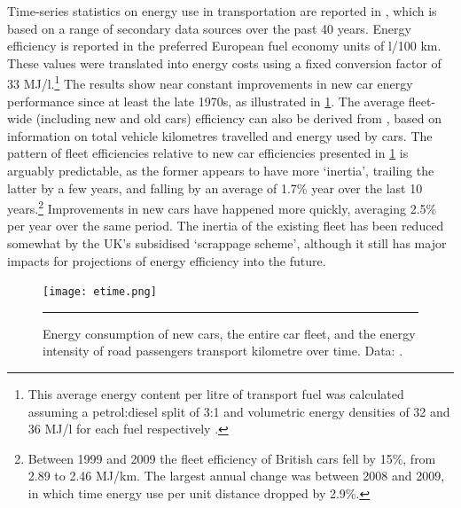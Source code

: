 Time-series statistics on energy use in transportation are
reported in \citet{Decc2011t}, which is based on a range of secondary data
sources over the past 40 years. Energy efficiency is reported in
the preferred European fuel economy units of l/100 km.
These values were translated into energy costs using a fixed conversion
factor of
33 MJ/l.\footnote{This
average energy content per litre of transport fuel was calculated
assuming a petrol:diesel split of 3:1 and volumetric energy densities
of 32 and 36 MJ/l for each fuel respectively \citep{Mj322010}.
}
The results show near constant improvements in new car energy performance
since at least the late 1970s, as illustrated in \cref{fig:etime}.
The average fleet-wide (including new and
old cars) efficiency can also be derived from \citet{Decc2011t}, based on
information on total vehicle kilometres travelled and energy used by cars.
The pattern of fleet efficiencies relative to new car efficiencies
presented in \cref{fig:etime} is arguably predictable, as the former
appears to have more `inertia', trailing the latter
by a few years, and falling by an average of 1.7\% year over the last 10
years.\footnote{Between 1999 and 2009 the fleet
efficiency of British cars fell by 15\%, from 2.89 to 2.46 MJ/km. The largest
annual change was  between 2008 and 2009, in which time energy use
per unit distance dropped by 2.9\%.
}
Improvements in new cars have happened more quickly, averaging 2.5\% per year
over the same period. The inertia of the existing fleet has been reduced
somewhat by the UK's subsidised `scrappage scheme', although it still has
major impacts for projections of energy efficiency into the future. 
\begin{figure}[h]
  \centerline{
    \texttt{[image: etime.png]}}
    \rule{35em}{0.5pt}
  \caption[Fleet efficiency of UK vehicles over time]{Energy consumption of new
cars, the entire car fleet, and the energy intensity of road passengers
transport kilometre over time. Data: \citep{Decc2011t}.}
  \label{fig:etime}
\end{figure}

